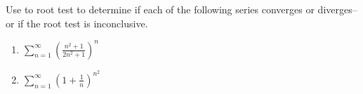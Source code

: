 \documentclass[12 pt]{article}
\begin{document}
Use to root test to determine if each of the following series converges or diverges--or if the root test is inconclusive. 

\begin{enumerate}

\item $\displaystyle{ \sum_{n=1}^{\infty} \left( \frac{n^2+1}{2n^2+1} \right)^n } $


\item $\displaystyle{ \sum_{n=1}^{\infty} \left( 1 + \frac{1}{n} \right)^{n^{2}} } $


\end{enumerate}













\end{document}
